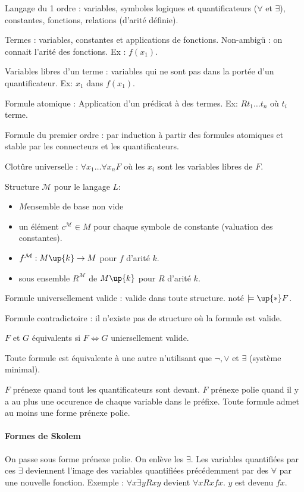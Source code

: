 \documentclass[french]{article}
\begin{document}
Langage du 1 ordre : variables, symboles logiques et quantificateurs ($\forall$ et $\exists$), constantes, fonctions, relations (d'arité définie).

Termes : variables, constantes et applications de fonctions. Non-ambigü : on connait l'arité des fonctions. Ex : $f (x_1)$.

Variables libres d'un terme : variables qui ne sont pas dans la portée d'un quantificateur. Ex: $x_1$ dans $f (x_1)$. 

Formule atomique : Application d'un prédicat à des termes. Ex: $R t_1\dots t_n$ où $t_i$ terme.

Formule du premier ordre : par induction à partir des formules atomiques et stable par les connecteurs et les quantificateurs.

Clotûre universelle : $\forall x_1\dots\forall x_n F$ où les $x_i$ sont les variables libres de $F$.

Structure $\mathcal{M}$ pour le langage $L$:
\begin{itemize}
\item $M$ensemble de base non vide
\item un élément $c^{\mathcal{M}}\in M$ pour chaque symbole de constante (valuation des constantes).
\item $f^{\mathcal{M}}:M\up{k}\rightarrow M$ pour $f$ d'arité $k$.
\item sous ensemble $R^{\mathcal{M}}$ de $M\up{k}$ pour $R$ d'arité $k$.
\end{itemize}


Formule universellement valide : valide dans toute structure. noté $\models\up{*} F$.

Formule contradictoire : il n'existe pas de structure où la formule est valide.

$F$ et $G$ équivalents si $F\Leftrightarrow G$ uniersellement valide.

Toute formule est équivalente à une autre n'utilisant que $\neg, \vee$ et $\exists$ (système minimal).


$F$ prénexe quand tout les quantificateurs sont devant. $F$ prénexe polie quand il y a au plus une occurence de chaque variable dans le préfixe. Toute formule admet au moins une forme prénexe polie.

\paragraph{Formes de Skolem}
On passe sous forme prénexe polie. On enlève les $\exists$. Les variables quantifiées par ces $\exists$ deviennent l'image des variables quantifiées précédemment par des $\forall$ par une nouvelle fonction.
Exemple : $\forall x\exists y Rxy$ devient $\forall x Rxfx$. $y$ est devenu $fx$.
\end{document}
